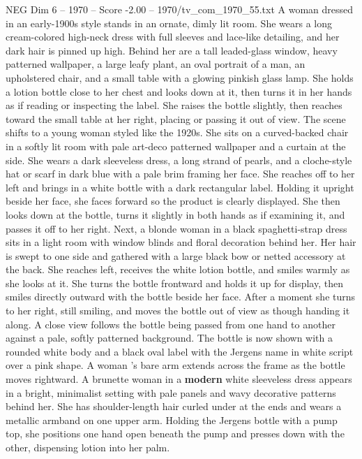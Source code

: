 \begin{textsample}{NEG Dim 6 – 1970 – Score -2.00 – 1970/tv\_com\_1970\_55.txt}  \label{ex:f6_neg_052}
A woman dressed in an early-1900s style stands in an ornate, dimly lit room.
She wears a long cream-colored high-neck dress with full sleeves and lace-like detailing, and her dark hair is pinned up high.
Behind her are a tall leaded-glass window, heavy patterned wallpaper, a large leafy plant, an oval portrait of a man, an upholstered chair, and a small table with a glowing pinkish glass lamp.
She holds a lotion bottle close to her chest and looks down at it, then turns it in her hands as if reading or inspecting the label.
She raises the bottle slightly, then reaches toward the small table at her right, placing or passing it out of view.
The scene shifts to a young woman styled like the 1920s.
She sits on a curved-backed chair in a softly lit room with pale art-deco patterned wallpaper and a curtain at the side.
She wears a dark sleeveless dress, a long strand of pearls, and a cloche-style hat or scarf in dark blue with a pale brim framing her face.
She reaches off to her left and brings in a white bottle with a dark rectangular label.
Holding it upright beside her face, she faces forward so the product is clearly displayed.
She then looks down at the bottle, turns it slightly in both hands as if examining it, and passes it off to her right.
Next, a blonde woman in a black spaghetti-strap dress sits in a light room with window blinds and floral decoration behind her.
Her hair is swept to one side and gathered with a large black bow or netted accessory at the back.
She reaches left, receives the white lotion bottle, and smiles warmly as she looks at it.
She turns the bottle frontward and holds it up for display, then smiles directly outward with the bottle beside her face.
After a moment she turns to her right, still smiling, and moves the bottle out of view as though handing it along.
A close view follows the bottle being passed from one hand to another against a pale, softly patterned background.
The bottle is now shown with a rounded white body and a black oval label with the Jergens name in white script over a pink shape.
A woman ’s bare arm extends across the frame as the bottle moves rightward.
A brunette woman in a \textbf{modern} white sleeveless dress appears in a bright, minimalist setting with pale panels and wavy decorative patterns behind her.
She has shoulder-length hair curled under at the ends and wears a metallic armband on one upper arm.
Holding the Jergens bottle with a pump top, she positions one hand open beneath the pump and presses down with the other, dispensing lotion into her palm.

\end{textsample}
